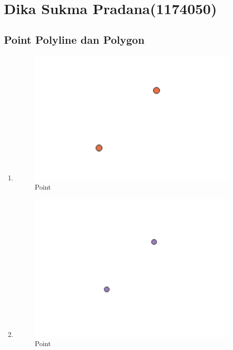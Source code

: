 \section{Dika Sukma Pradana(1174050)}
\subsection{Point Polyline dan Polygon}
\begin{enumerate}
	\item 
	
	\begin{figure}[H]
		\includegraphics[width=12cm]{figures/1174050/1.PNG}
		\centering
		\caption{Point}
	\end{figure}
	
	\item 
	
	\begin{figure}[H]
		\includegraphics[width=12cm]{figures/1174050/2.PNG}
		\centering
		\caption{Point}
	\end{figure}
	

\end{enumerate}
